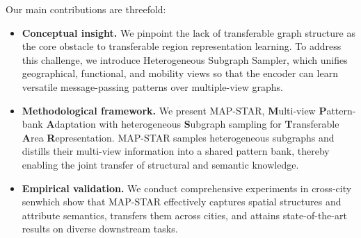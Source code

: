Our main contributions are threefold:

\begin{itemize}
    \item \textbf{Conceptual insight.} We pinpoint the lack of transferable graph structure as the core obstacle to transferable region representation learning. To address this challenge, we introduce Heterogeneous Subgraph Sampler, which unifies geographical, functional, and mobility views so that the encoder can learn versatile message-passing patterns over multiple-view graphs.
    \item \textbf{Methodological framework.} We present MAP-STAR, \textbf{M}ulti-view \textbf{P}attern-bank \textbf{A}daptation with heterogeneous \textbf{S}ubgraph sampling for \textbf{T}ransferable \textbf{A}rea \textbf{R}epresentation. MAP-STAR samples heterogeneous subgraphs and distills their multi-view information into a shared pattern bank, thereby enabling the joint transfer of structural and semantic knowledge.
    \item \textbf{Empirical validation.} We conduct comprehensive experiments in cross-city senwhich show that MAP-STAR effectively captures spatial structures and attribute semantics, transfers them across cities, and attains state-of-the-art results on diverse downstream tasks.
\end{itemize}